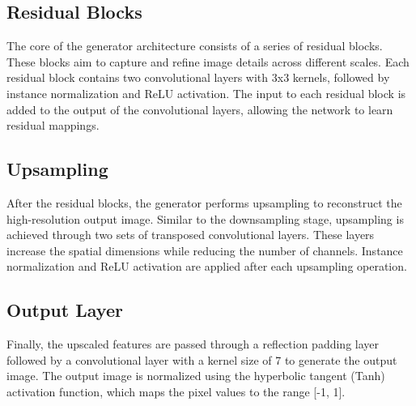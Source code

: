 \subsection*{Residual Blocks}
The core of the generator architecture consists of a series of residual blocks. These blocks aim to capture and refine image details across different scales. Each residual block contains two convolutional layers with 3x3 kernels, followed by instance normalization and ReLU activation. The input to each residual block is added to the output of the convolutional layers, allowing the network to learn residual mappings.
\subsection*{Upsampling}
After the residual blocks, the generator performs upsampling to reconstruct the high-resolution output image. Similar to the downsampling stage, upsampling is achieved through two sets of transposed convolutional layers. These layers increase the spatial dimensions while reducing the number of channels. Instance normalization and ReLU activation are applied after each upsampling operation.
\subsection*{Output Layer}
Finally, the upscaled features are passed through a reflection padding layer followed by a convolutional layer with a kernel size of 7 to generate the output image. The output image is normalized using the hyperbolic tangent (Tanh) activation function, which maps the pixel values to the range [-1, 1].

